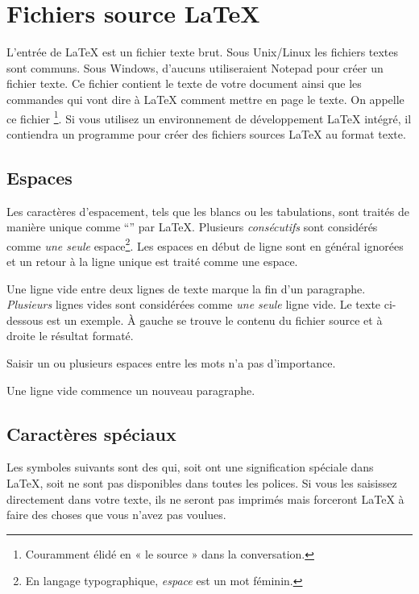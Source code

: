 \section{Fichiers source \LaTeX{}}

L'entrée de \LaTeX{} est un fichier texte brut. Sous Unix/Linux les
fichiers textes sont communs. Sous Windows, d'aucuns utiliseraient
Notepad pour créer un fichier texte. Ce fichier contient le texte
de votre document ainsi que les commandes qui vont dire à \LaTeX{}
comment mettre en page le texte. On appelle ce fichier \emph{}\footnote{Couramment élidé en « le source » dans la
conversation. \NdT}. Si vous utilisez un environnement de
développement \LaTeX{} intégré, il contiendra un programme pour créer des
fichiers sources \LaTeX{} au format texte.

\subsection{Espaces}

Les caractères d'espacement, tels que les blancs ou les tabulations,
sont traités de manière unique comme \enquote{} par
\LaTeX{}. Plusieurs  \emph{consécutifs} sont considérés
comme \emph{une seule} espace\footnote{En langage typographique,
    \emph{espace} est un mot féminin. \NdT}.  Les espaces en début
de ligne sont en général ignorées et un retour à la ligne unique est
traité comme une espace.  

Une ligne vide entre deux lignes de texte marque la fin d'un
paragraphe. \emph{Plusieurs} lignes vides sont considérées comme
\emph{une seule} ligne vide. Le texte ci-dessous est un exemple. À
gauche se trouve le contenu du fichier source et à droite le
résultat formaté.

\begin{example}
Saisir un ou      plusieurs
espaces entre  les     mots
n'a pas d'importance.

Une ligne vide commence
un nouveau paragraphe.
\end{example}

\subsection{Caractères spéciaux}

Les symboles suivants sont des  qui, soit ont
une signification spéciale dans \LaTeX{}, soit ne sont pas disponibles
dans toutes les polices. Si vous les saisissez directement dans votre
texte, ils ne seront pas imprimés mais forceront \LaTeX{} à faire des
choses que vous n'avez pas voulues.

